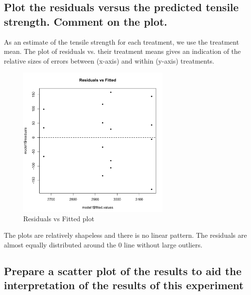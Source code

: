 \documentclass[11pt]{article}
\begin{document}
\subsection{Plot the residuals versus the predicted tensile strength. Comment on the plot.}

As an estimate of the tensile strength for each treatment, we use the treatment mean. The plot of residuals vs. their treatment means gives an indication of the relative sizes of errors between (x-axis) and within (y-axis) treatments. 

\begin{figure}[H]
    \centering
    \includegraphics[width=3.0in]{../pictures/hw2_q1_pf.png}
    \caption{Residuals vs Fitted plot}
    \label{Residuals vs Fitted plot}
\end{figure}


The plots are relatively shapeless and there is no linear pattern. The residuals are almost equally distributed around the 0 line without large outliers.


\subsection{Prepare a scatter plot of the results to aid the interpretation of the results of this experiment}
\end{document}
